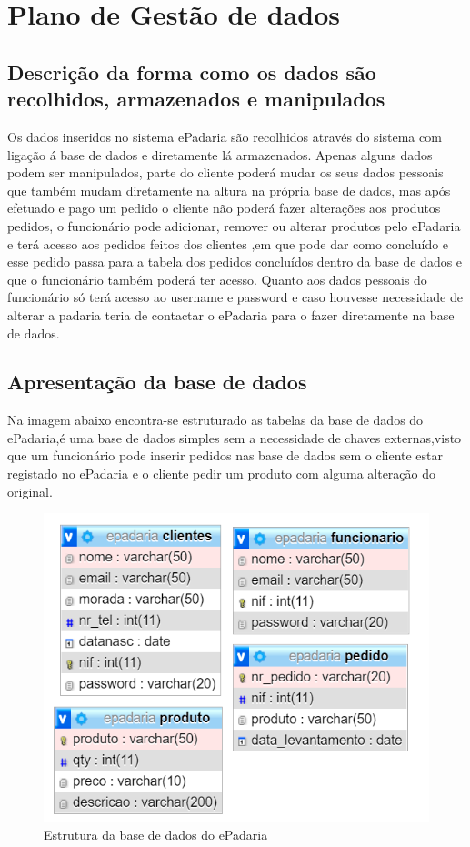 \chapter{Plano de Gestão de dados}
\label{plano_de_gestao_de_dados}
\section{Descrição da forma como os dados são recolhidos, armazenados e manipulados}
Os dados inseridos no sistema ePadaria são recolhidos através do sistema com ligação á base de dados e diretamente lá armazenados. Apenas alguns dados podem ser manipulados, parte do cliente poderá mudar os seus dados pessoais que também mudam diretamente na altura na própria base de dados, mas após efetuado e pago um pedido o cliente não poderá fazer alterações aos produtos pedidos, o funcionário pode adicionar, remover ou alterar produtos pelo ePadaria e terá acesso aos pedidos feitos dos clientes ,em que pode dar como concluído e esse pedido passa para a tabela dos pedidos concluídos dentro da base de dados e que o funcionário também poderá ter acesso. Quanto aos dados pessoais do funcionário só terá acesso ao username e password e caso houvesse necessidade de alterar a padaria teria de contactar o ePadaria para o fazer diretamente na base de dados.
\section{Apresentação da base de dados}

Na imagem abaixo encontra-se estruturado as tabelas da base de dados do ePadaria,é uma base de dados simples sem a necessidade de chaves externas,visto que um funcionário pode inserir pedidos nas base de dados sem o cliente estar registado no ePadaria e o cliente pedir um produto com alguma alteração do original.
\begin{figure}[H]
	\centering
	\includegraphics{bd}
	\caption{Estrutura da base de dados do ePadaria}
	\label{fig:bd}
\end{figure}

